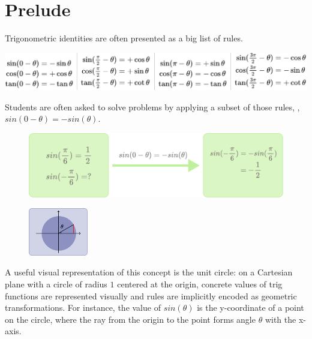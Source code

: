 
\chapter*{Prelude}

\vspace{-30pt}

Trigonometric identities are often presented as a big list of rules. 

\noindent\includegraphics[width=\linewidth]{assets/prelude/trig-identities.pdf}


\noindent Students are often asked to solve problems by applying a subset of those rules, \eg, $sin(0 - \theta) = -sin(\theta)$.

\begin{figure}[h]
    \centering
    \includegraphics[width=0.75\linewidth]{assets/prelude/symbolic-transform.pdf}
\end{figure}

\setlength{\columnsep}{1em}
\setlength{\intextsep}{0em}
\begin{figure}
\vspace{-10pt}
  \begin{center}
    \includegraphics[width=0.23\textwidth]{assets/prelude/unit-circle.pdf}
  \end{center}
\end{figure}

A useful visual representation of this concept is the unit circle: on a Cartesian plane with a circle of radius $1$ centered at the origin, concrete values of trig functions are represented visually and rules are implicitly encoded as geometric transformations. For instance, the value of $sin(\theta)$ is the y-coordinate of a point on the circle, where the ray from the origin to the point forms angle $\theta$ with the x-axis.


